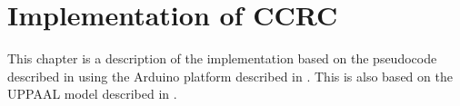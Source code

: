 \chapter{Implementation of CCRC}
This chapter is a description of the implementation based on the pseudocode described in  using the Arduino platform described in . 
This is also based on the UPPAAL model described in .
